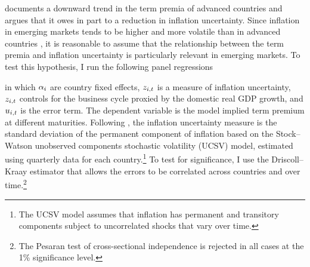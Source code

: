 {\cite{Wright:2011} documents a downward trend in the term premia of advanced countries and argues that it
owes in part to a reduction in inflation uncertainty.
Since inflation in emerging markets tends to be higher and more volatile than in advanced countries \citep{HaKoseOhnsorge:2019}, it is reasonable to assume that the relationship between the term premia and inflation uncertainty is particularly %
relevant in emerging markets. %
To test this hypothesis, I run the following panel regressions 

\noindent in which \(\alpha_{i}\) are country fixed effects, \(z_{i,t}\) is a measure of inflation uncertainty,
\(z_{i,t}\) controls for the business cycle proxied by the domestic real GDP growth, 
and \(u_{i,t}\) is the error term. 
The dependent variable is the model implied term premium at different maturities.
Following \cite{Wright:2011}, the inflation uncertainty measure is the standard deviation of the permanent component of inflation based on the Stock--Watson unobserved components stochastic volatility (UCSV) model, estimated using quarterly data for each country.\footnote{ The UCSV model assumes that inflation has permanent and transitory components subject to uncorrelated shocks that vary over time.}
To test for significance, I use the Driscoll--Kraay estimator that allows the errors to be correlated across countries and over time.\footnote{ The Pesaran test of cross-sectional independence is rejected in all cases at the 1\% significance level.}

}
